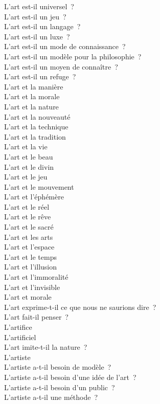 \documentclass[a4paper,12pt]{article}
\begin{document}
L'art est-il universel ? \\
L'art est-il un jeu ? \\
L'art est-il un langage ? \\
L'art est-il un luxe ? \\
L'art est-il un mode de connaissance ? \\
L'art est-il un modèle pour la philosophie ? \\
L'art est-il un moyen de connaître ? \\
L'art est-il un refuge ? \\
L'art et la manière \\
L'art et la morale \\
L'art et la nature \\
L'art et la nouveauté \\
L'art et la technique \\
L'art et la tradition \\
L'art et la vie \\
L'art et le beau \\
L'art et le divin \\
L'art et le jeu \\
L'art et le mouvement \\
L'art et l'éphémère \\
L'art et le réel \\
L'art et le rêve \\
L'art et le sacré \\
L'art et les arts \\
L'art et l'espace \\
L'art et le temps \\
L'art et l'illusion \\
L'art et l'immoralité \\
L'art et l'invisible \\
L'art et morale \\
L'art exprime-t-il ce que nous ne saurions dire ? \\
L'art fait-il penser ? \\
L'artifice \\
L'artificiel \\
L'art imite-t-il la nature ? \\
L'artiste \\
L'artiste a-t-il besoin de modèle ? \\
L'artiste a-t-il besoin d'une idée de l'art ? \\
L'artiste a-t-il besoin d'un public ? \\
L'artiste a-t-il une méthode ? \\
\end{document}
